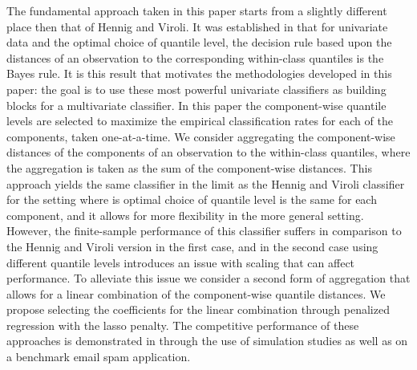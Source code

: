 The fundamental approach taken in this paper starts from a slightly different
place then that of Hennig and Viroli.  It was established in \cite{hennig2016}
that for univariate data and the optimal choice of quantile level, the decision
rule based upon the distances of an observation to the corresponding
within-class quantiles is the Bayes rule.  It is this result that motivates the
methodologies developed in this paper: the goal is to use these most powerful
univariate classifiers as building blocks for a multivariate classifier.  In
this paper the component-wise quantile levels are selected to maximize the
empirical classification rates for each of the components, taken one-at-a-time.
We consider aggregating the component-wise distances of the components of an
observation to the within-class quantiles, where the aggregation is taken as the
sum of the component-wise distances.  This approach yields the same classifier
in the limit as the Hennig and Viroli classifier for the setting where is
optimal choice of quantile level is the same for each component, and it allows
for more flexibility in the more general setting.  However, the finite-sample
performance of this classifier suffers in comparison to the Hennig and Viroli
version in the first case, and in the second case using different quantile
levels introduces an issue with scaling that can affect performance.  To
alleviate this issue we consider a second form of aggregation that allows for a
linear combination of the component-wise quantile distances.  We propose
selecting the coefficients for the linear combination through penalized
regression with the lasso penalty.  The competitive performance of these
approaches is demonstrated in through the use of simulation studies as well as
on a benchmark email spam application.





